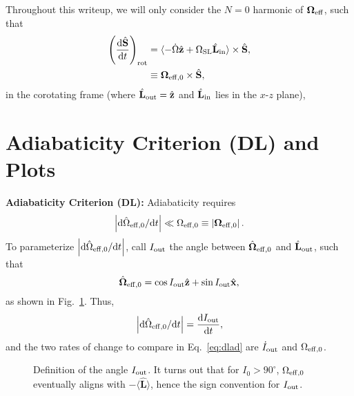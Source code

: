 \documentclass[11pt,
        usenames, %
        dvipsnames %
    ]{article}
\newcommand*{\rd}[2]{\frac{\mathrm{d}#1}{\mathrm{d}#2}}
\newcommand*{\rdil}[2]{\mathrm{d}#1 / \mathrm{d}#2}
\newcommand*{\bm}[1]{\boldsymbol{\mathbf{#1}}}
\newcommand*{\uv}[1]{\hat{\bm{#1}}}
\newcommand*{\abs}[1]{\left|#1\right|}
\newcommand*{\ev}[1]{\langle#1\rangle}
\newcommand*{\p}[1]{\left(#1\right)}
\begin{document}
\def\Snospace~{\S{}} %
\renewcommand*{\sectionautorefname}{\Snospace}
\renewcommand*{\appendixautorefname}{\Snospace}
\renewcommand*{\figureautorefname}{Fig.}
\renewcommand*{\equationautorefname}{Eq.}
\renewcommand*{\tableautorefname}{Tab.}

Throughout this writeup, we will only consider the $N = 0$ harmonic of
$\bm{\Omega}_{\rm eff}$, such that
\begin{align}
    \p{\rd{\uv{S}}{t}}_{\rm rot}
            &= \ev{-\dot{\Omega}\uv{z} + \Omega_{\rm SL} \uv{L}_{\rm in}}
                \times \uv{S}\label{eq:initial},\\
        &\equiv \bm{\Omega}_{\rm eff,0} \times \uv{S},
\end{align}
in the corotating frame (where $\uv{L}_{\rm out} = \uv{z}$ and $\uv{L}_{\rm in}$
lies in the $x$-$z$ plane),

\section{Adiabaticity Criterion (DL) and Plots}

\textbf{Adiabaticity Criterion (DL):} Adiabaticity requires
\begin{equation}
    \abs{\rdil{\hat{\Omega}_{\rm eff,0}}{t}} \ll \Omega_{\rm eff,0} \equiv
        \abs{\bm{\Omega}_{\rm eff,0}}.\label{eq:dlad}
\end{equation}
To parameterize $\abs{\rdil{\hat{\Omega}_{\rm eff,0}}{t}}$, call $I_{\rm out}$
the angle between $\uv{\Omega}_{\rm eff,0}$ and $\uv{L}_{\rm out}$, such that
\begin{equation}
    \uv{\Omega}_{\rm eff,0} = \cos I_{\rm out} \uv{z} + \sin I_{\rm out}\uv{x},
\end{equation}
as shown in Fig.~\ref{fig:iout}. Thus,
\begin{equation}
    \abs{\rdil{\hat{\Omega}_{\rm eff,0}}{t}} = \rd{I_{\rm out}}{t},
\end{equation}
and the two rates of change to compare in Eq.~\eqref{eq:dlad} are $\dot{I}_{\rm
out}$ and $\Omega_{\rm eff,0}$.
\begin{figure}[t]
    \centering
    \caption{Definition of the angle $I_{\rm out}$. It turns out that for $I_0 >
    90^\circ$, $\Omega_{\rm eff, 0}$ eventually aligns with $-\ev{\uv{L}}$,
    hence the sign convention for $I_{\rm out}$.}\label{fig:iout}
\end{figure}
\end{document}
